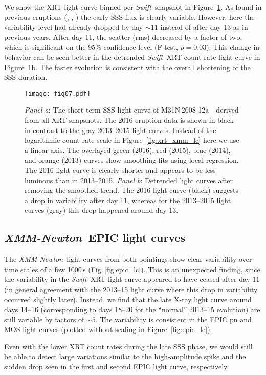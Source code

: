 \documentclass[twocolumn,tighten]{aastex6}
\def\swift{{\it Swift~}}
\def\xmm{{\it XMM-Newton~}}
\def\nova{{M31N\,2008-12a~}}
\newcommand{\xonek}{\citetalias{2014A&A...563L...8H}}
\newcommand{\xtwok}{\citetalias{2015A&A...580A..46H}}
\newcommand{\othreek}{\citetalias{2016ApJ...833..149D}}
\begin{document}
We show the XRT light curve binned per \swift snapshot in Figure~\ref{fig:xrt_split}. As found in previous eruptions (\xonek, \xtwok, \othreek) the early SSS flux is clearly variable. However, here the variability level had already dropped by day $\sim11$ instead of after day 13 as in previous years. After day 11, the scatter (rms) decreased by a factor of two, which is significant on the 95\% confidence level (F-test, $p = 0.03$). This change in behavior can be seen better in the detrended \swift XRT count rate light curve in Figure~\ref{fig:xrt_split}b. The faster evolution is consistent with the overall shortening of the SSS duration.

\begin{figure}
\texttt{[image: fig07.pdf]}
\caption{\textit{Panel a}: The short-term SSS light curve of \nova\ derived from all XRT snapshots. The 2016 eruption data is shown in black in contrast to the gray 2013--2015 light curves. Instead of the logarithmic count rate scale in Figure~\ref{fig:xrt_xmm_lc} here we use a linear axis. The overlayed green (2016), red (2015), blue (2014), and orange (2013) curves show smoothing fits using local regression. The 2016 light curve is clearly shorter and appears to be less luminous than in 2013--2015. \textit{Panel b}: Detrended light curves after removing the smoothed trend. The 2016 light curve (black) suggests a drop in variability after day 11, whereas for the 2013--2015 light curves (gray) this drop happened around day 13.}
\label{fig:xrt_split}
\end{figure}

\subsection{\xmm EPIC light curves}\label{sec:xmm_lc}

The \xmm light curves from both pointings show clear variability over time scales of a few 1000\,s (Fig.\,\ref{fig:epic_lc}). This is an unexpected finding, since the variability in the \swift XRT light curve appeared to have ceased after day 11 (in general agreement with the 2013--15 light curve where this drop in variability occurred slightly later). Instead, we find that the late X-ray light curve around days 14--16 (corresponding to days 18--20 for the ``normal'' 2013--15 evolution) are still variable by factors of $\sim5$. The variability is consistent in the EPIC pn and MOS light curves (plotted without scaling in Figure~\ref{fig:epic_lc}).

Even with the lower XRT count rates during the late SSS phase, we would still be able to detect large variations similar to the high-amplitude spike and the sudden drop seen in the first and second EPIC light curve, respectively.
\end{document}
